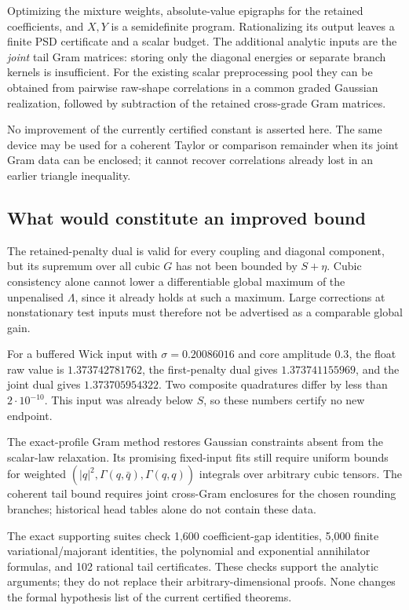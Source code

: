 Optimizing the mixture weights, absolute-value epigraphs for the retained
coefficients, and $X,Y$ is a semidefinite program. Rationalizing its output
leaves a finite PSD certificate and a scalar budget. The additional
analytic inputs are the \emph{joint} tail Gram matrices: storing only the
diagonal energies or separate branch kernels is insufficient. For the
existing scalar preprocessing pool they can be obtained from pairwise
raw-shape correlations in a common graded Gaussian realization, followed
by subtraction of the retained cross-grade Gram matrices.

No improvement of the currently certified constant is asserted here.
The same device may be used for a coherent Taylor or comparison remainder
when its joint Gram data can be enclosed; it cannot recover correlations
already lost in an earlier triangle inequality.

\subsection{What would constitute an improved bound}
The retained-penalty dual is valid for every coupling and diagonal
component, but its supremum over all cubic $G$ has not been bounded by
$S+\eta$. Cubic consistency alone cannot lower a differentiable global
maximum of the unpenalised $\Lambda$, since it already holds at such a
maximum. Large corrections at nonstationary test inputs must therefore
not be advertised as a comparable global gain.

For a buffered Wick input with $\sigma=0.20086016$ and core amplitude
$0.3$, the float raw value is $1.373742781762$, the first-penalty dual
gives $1.373741155969$, and the joint dual gives $1.373705954322$.
Two composite quadratures differ by less than $2\cdot10^{-10}$.
This input was already below $S$, so these numbers certify no new endpoint.

The exact-profile Gram method restores Gaussian constraints absent from
the scalar-law relaxation. Its promising fixed-input fits still require
uniform bounds for weighted $(|q|^2,\Gamma(q,\bar q),\Gamma(q,q))$
integrals over arbitrary cubic tensors. The coherent tail bound requires
joint cross-Gram enclosures for the chosen rounding branches; historical
head tables alone do not contain these data.

The exact supporting suites check 1,600 coefficient-gap identities,
5,000 finite variational/majorant identities, the polynomial and
exponential annihilator formulas, and 102 rational tail certificates.
These checks support the analytic arguments; they do not replace their
arbitrary-dimensional proofs. None changes the formal hypothesis list
of the current certified theorems.

